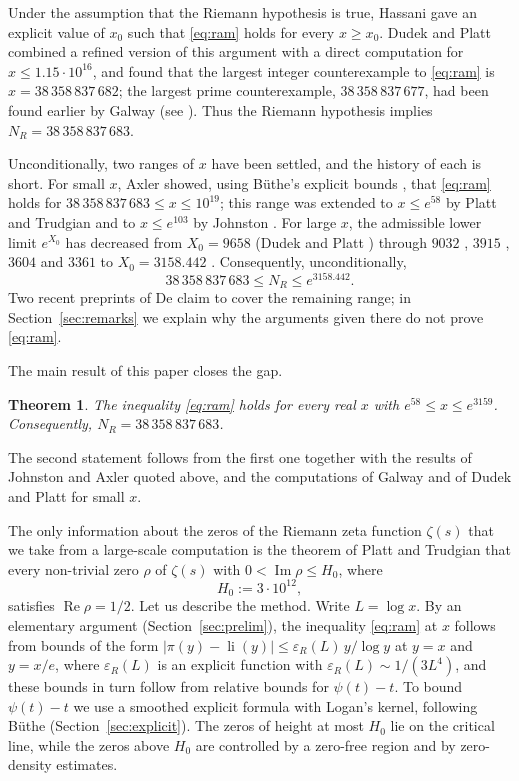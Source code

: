 \documentclass[11pt]{amsart}
\numberwithin{equation}{section}
\newtheorem{theorem}{Theorem}[section]
\theoremstyle{definition}
\theoremstyle{remark}
\newcommand{\li}{\operatorname{li}}
\newcommand{\Rp}{\operatorname{Re}}
\newcommand{\Ip}{\operatorname{Im}}
\newcommand{\eps}{\varepsilon}
\begin{document}
Under the assumption that the Riemann hypothesis is true, Hassani \cite{Hassani} gave an explicit value of $x_0$ such that \eqref{eq:ram} holds for every $x \geq x_0$.
Dudek and Platt \cite{DudekPlatt} combined a refined version of this argument with a direct computation for $x \leq 1.15\cdot 10^{16}$, and found that the largest integer counterexample to \eqref{eq:ram} is $x = 38\,358\,837\,682$; the largest prime counterexample, $38\,358\,837\,677$, had been found earlier by Galway (see \cite{DudekPlatt}).
Thus the Riemann hypothesis implies $N_R = 38\,358\,837\,683$.

Unconditionally, two ranges of $x$ have been settled, and the history of each is short.
For small $x$, Axler \cite{Axler2} showed, using B\"uthe's explicit bounds \cite{Buthe2018}, that \eqref{eq:ram} holds for $38\,358\,837\,683 \leq x \leq 10^{19}$; this range was extended to $x \leq e^{58}$ by Platt and Trudgian \cite{PlattTrudgian} and to $x \leq e^{103}$ by Johnston \cite[Theorem~5.1]{Johnston}.
For large $x$, the admissible lower limit $e^{X_0}$ has decreased from $X_0 = 9658$ (Dudek and Platt \cite{DudekPlatt}) through $9032$ \cite{Axler2}, $3915$ \cite{PlattTrudgian}, $3604$ \cite{CullyHugillJohnston} and $3361$ \cite{JohnstonYang} to $X_0 = 3158.442$ \cite[Theorem~1.1]{Axler}.
Consequently, unconditionally,
\[
38\,358\,837\,683 \leq N_R \leq e^{3158.442}.
\]
Two recent preprints of De \cite{De1,De2} claim to cover the remaining range; in Section~\ref{sec:remarks} we explain why the arguments given there do not prove \eqref{eq:ram}.

The main result of this paper closes the gap.

\begin{theorem}\label{thm:main}
The inequality \eqref{eq:ram} holds for every real $x$ with $e^{58} \leq x \leq e^{3159}$.
Consequently, $N_R = 38\,358\,837\,683$.
\end{theorem}

The second statement follows from the first one together with the results of Johnston \cite[Theorem~5.1]{Johnston} and Axler \cite[Theorem~1.1]{Axler} quoted above, and the computations of Galway and of Dudek and Platt \cite{DudekPlatt} for small $x$.

The only information about the zeros of the Riemann zeta function $\zeta(s)$ that we take from a large-scale computation is the theorem of Platt and Trudgian \cite{PlattTrudgianRH} that every non-trivial zero $\rho$ of $\zeta(s)$ with $0 < \Ip \rho \leq H_0$, where
\[
H_0 := 3\cdot 10^{12},
\]
satisfies $\Rp\rho = 1/2$.
Let us describe the method.
Write $L = \log x$.
By an elementary argument (Section~\ref{sec:prelim}), the inequality \eqref{eq:ram} at $x$ follows from bounds of the form $|\pi(y) - \li(y)| \leq \eps_R(L)\,y/\log y$ at $y = x$ and $y = x/e$, where $\eps_R(L)$ is an explicit function with $\eps_R(L) \sim 1/(3L^4)$, and these bounds in turn follow from relative bounds for $\psi(t) - t$.
To bound $\psi(t) - t$ we use a smoothed explicit formula with Logan's kernel, following B\"uthe \cite{Buthe2016,Buthe2018} (Section~\ref{sec:explicit}).
The zeros of height at most $H_0$ lie on the critical line, while the zeros above $H_0$ are controlled by a zero-free region and by zero-density estimates.
\end{document}
